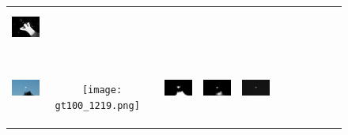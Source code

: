 \documentclass[10pt,twocolumn,letterpaper]{article}
\begin{document}
\begin{figure}
\begin{tabular}{@{}c@{}c@{}c@{}c@{}c@{}c@{}c@{}c@{}c@{}c@{}c}
\includegraphics[width=0.085\linewidth,height=1.25cm]{0190_DRFI.png} \ \\
\vspace{-1mm}
\includegraphics[width=0.085\linewidth,height=1.25cm]{100_1219.png} \ &
\texttt{[image: gt100\_1219.png]} \ &
\includegraphics[width=0.085\linewidth,height=1.25cm]{100_1219_Amulet.png} \ &
\includegraphics[width=0.085\linewidth,height=1.25cm]{100_1219_RFCN.jpg} \ &
\includegraphics[width=0.085\linewidth,height=1.25cm]{100_1219_DCL.png} \ &

\end{tabular}
\end{figure}
\end{document}
